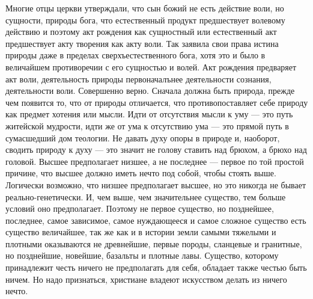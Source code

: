 \documentclass[12pt]{article}
\begin{document}
Многие отцы церкви утверждали, что сын божий не есть действие воли, но сущности, природы бога, что естественный продукт предшествует волевому действию и поэтому акт рождения как сущностный или естественный акт предшествует акту творения как акту воли. Так заявила свои права истина природы даже в пределах сверхъестественного бога, хотя это и было в величайшем противоречии с его сущностью и волей. Акт рождения предваряет акт воли, деятельность природы первоначалънее деятельности сознания, деятельности воли. Совершенно верно. Сначала должна быть природа, прежде чем появится то, что от природы отличается, что противопоставляет себе природу как предмет хотения или мысли. Идти от отсутствия мысли к уму --- это путь житейской мудрости, идти же от ума к отсутствию ума --- это прямой путь в сумасшедший дом теологии. Не давать духу опоры в природе и, наоборот, сводить природу к духу --- это значит не голову ставить над брюхом, а брюхо над головой. Высшее предполагает низшее, а не последнее --- первое по той простой причине, что высшее должно иметь нечто под собой, чтобы стоять выше. Логически возможно, что низшее предполагает высшее, но это никогда не бывает реально-генетически. И, чем выше, чем значительнее существо, тем больше условий оно предполагает. Поэтому не первое существо, но позднейшее, последнее, самое зависимое, самое нуждающееся и самое сложное существо есть существо величайшее, так же как и в истории земли самыми тяжелыми и плотными оказываются не древнейшие, первые породы, сланцевые и гранитные, но позднейшие, новейшие, базальты и плотные лавы. Существо, которому принадлежит честь ничего не предполагать для себя, обладает также честью быть ничем. Но надо признаться, христиане владеют искусством делать из ничего нечто.



\section{}
\end{document}
